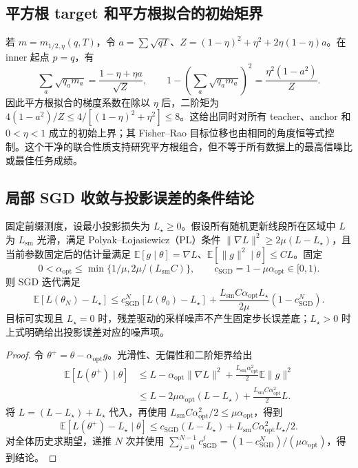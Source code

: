 \documentclass[lang=cn,scheme=chinese,openany]{../book/elegantbook}
\newcommand{\E}{\mathbb E}
\begin{document}
\subsection{平方根 target 和平方根拟合的初始矩界}

若 $m=m_{1/2,\eta}(q,T)$，令 $a=\sum\sqrt{qT}$、$Z=(1-\eta)^2+\eta^2+2\eta(1-\eta)a$。在 inner 起点 $p=q$，有
\begin{equation}
 \sum_a\sqrt{q_am_a}=\frac{1-\eta+\eta a}{\sqrt Z},\qquad
 1-\left(\sum_a\sqrt{q_am_a}\right)^2=\frac{\eta^2(1-a^2)}Z.
\end{equation}
因此平方根拟合的梯度系数在除以 $\eta$ 后，二阶矩为 $4(1-a^2)/Z\le4/[(1-\eta)^2+\eta^2]\le8$。这给出同时对所有 teacher、anchor 和 $0<\eta<1$ 成立的初始上界；其 Fisher--Rao 目标位移也由相同的角度恒等式控制。这个干净的联合性质支持研究平方根组合，但不等于所有数据上的最高信噪比或最佳任务成绩。

\subsection{局部 SGD 收敛与投影误差的条件结论}

\begin{theorem}
\label{thm:power-conditional-sgd}
固定前缀测度，设最小投影损失为 $L_\star\ge0$。假设所有随机更新线段所在区域中 $L$ 为 $L_{\mathrm{sm}}$ 光滑，满足 Polyak--\L{}ojasiewicz（PL）条件 $\|\nabla L\|^2\ge2\mu(L-L_\star)$，且当前参数固定后的估计量满足 $\E[g\mid\theta]=\nabla L$、$\E[\|g\|^2\mid\theta]\le CL$。固定
\begin{equation}
 0<\alpha_{\mathrm{opt}}\le\min\{1/\mu,2\mu/(L_{\mathrm{sm}}C)\},\qquad
 c_{\mathrm{SGD}}=1-\mu\alpha_{\mathrm{opt}}\in[0,1).
\end{equation}
则 SGD 迭代满足
\begin{equation}
 \E[L(\theta_N)-L_\star]
 \le c_{\mathrm{SGD}}^N[L(\theta_0)-L_\star]
 +\frac{L_{\mathrm{sm}}C\alpha_{\mathrm{opt}}L_\star}{2\mu}(1-c_{\mathrm{SGD}}^N).
\end{equation}
目标可实现且 $L_\star=0$ 时，残差驱动的采样噪声不产生固定步长误差底；$L_\star>0$ 时上式明确给出投影误差对应的噪声项。
\end{theorem}

\begin{proof}
令 $\theta^+=\theta-\alpha_{\mathrm{opt}}g$。光滑性、无偏性和二阶矩界给出
\begin{align}
 \E[L(\theta^+)\mid\theta]
 &\le L-\alpha_{\mathrm{opt}}\|\nabla L\|^2+
 \frac{L_{\mathrm{sm}}\alpha_{\mathrm{opt}}^2}2\E\|g\|^2\\
 &\le L-2\mu\alpha_{\mathrm{opt}}(L-L_\star)
 +\frac{L_{\mathrm{sm}}C\alpha_{\mathrm{opt}}^2}{2}L.
\end{align}
将 $L=(L-L_\star)+L_\star$ 代入，再使用 $L_{\mathrm{sm}}C\alpha_{\mathrm{opt}}^2/2\le\mu\alpha_{\mathrm{opt}}$，得到
\begin{equation}
 \E[L(\theta^+)-L_\star\mid\theta]
 \le c_{\mathrm{SGD}}(L-L_\star)+L_{\mathrm{sm}}C\alpha_{\mathrm{opt}}^2L_\star/2.
\end{equation}
对全体历史求期望，递推 $N$ 次并使用 $\sum_{j=0}^{N-1}c_{\mathrm{SGD}}^j=(1-c_{\mathrm{SGD}}^N)/(\mu\alpha_{\mathrm{opt}})$，得到结论。
\end{proof}
\end{document}
